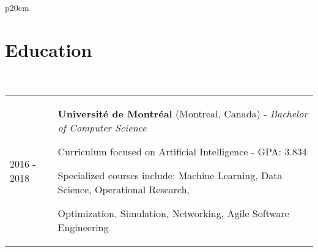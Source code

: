 \documentclass[letterpaper, 11pt]{article}
\begin{document}
\begin{tabular}{p{20cm}}
    \section*{Education}
    \\
    \begin{tabular}{p{2.4cm} p{18cm}}	
        2016 - 2018 & {\large \textbf{Université de Montréal} (Montreal, Canada) - \textit{Bachelor of Computer Science}}
        \vspace{0.2em}
        
                \hspace{1em} Curriculum focused on Artificial Intelligence  - GPA: 3.834 
                
                \hspace{1em} Specialized courses include: Machine Learning, Data Science, Operational Research, 
                
                \hspace{1em} Optimization, Simulation, Networking, Agile Software Engineering
    \end{tabular}
\end{tabular}
\end{document}
